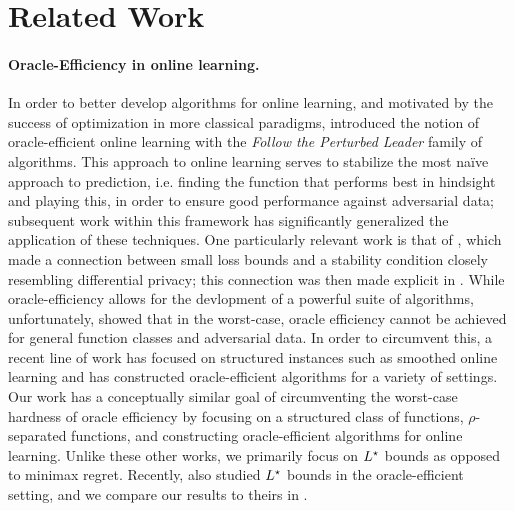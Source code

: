 \section{Related Work}\label{app:related_work}


\paragraph{Oracle-Efficiency in online learning.}
    In order to better develop algorithms for online learning, and motivated by the success of optimization in more classical paradigms,  \cite{kalai2005efficient} introduced the notion of oracle-efficient online learning with the \emph{Follow the Perturbed Leader} family of algorithms.  This approach to online learning serves to stabilize the most na{\"i}ve approach to prediction, i.e. finding the function  that performs best in hindsight and playing this, in order to ensure good performance against adversarial data; subsequent work within this framework \citep{dudik2020oracle,syrgkanis2016efficient,wang2022adaptive,agarwal2019learning,suggala2020online} has significantly generalized the application of these techniques.  One particularly relevant work is that of \citet{hutter2004prediction}, which made a connection between small loss bounds and a stability condition closely resembling differential privacy; this connection was  then made explicit in \cite{abernethy2019online}.  While oracle-efficiency allows for the devlopment of a powerful suite of algorithms,
    unfortunately, \cite{hazan2016computational} showed that in the worst-case, oracle efficiency cannot be achieved for general function classes and adversarial data. 
    In order to circumvent this, a recent line of work has focused on structured instances such as smoothed online learning \citep{haghtalab2020smoothed,oracle-efficient,haghtalab2022smoothed,block2022smoothed,DBLP:journals/corr/abs-2303-04845,DBLP:conf/colt/BlockP23,block2023oracle,pmlr-v247-block24a,block2024smoothed} and has constructed oracle-efficient algorithms for a variety of settings.
    Our work has a conceptually similar goal of circumventing the worst-case hardness of oracle efficiency by focusing on a structured class of functions, $\rho$-separated functions, and constructing oracle-efficient algorithms for online learning.  Unlike these other works, we primarily focus on $L^\star$ bounds as opposed to minimax regret.  Recently, \citet{wang2022adaptive} also studied $L^\star$ bounds in the oracle-efficient setting, and we compare our results to theirs in .


